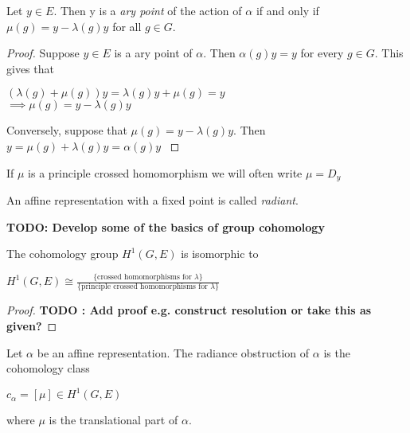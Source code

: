 \begin{prop}
    Let $y\in E$. Then y is a \textit{ary point} of the action of $\alpha$ if
    and only if $\mu(g) = y - \lambda(g)y$ for all $g \in G$.
    \label{prop:ary-point}
\end{prop}

\begin{proof}
    Suppose $y \in E$ is a ary point of $\alpha$. Then $\alpha(g)y = y$ for every $g \in G$.
    This gives that
    \begin{center}
        $(\lambda(g) + \mu(g))y = \lambda(g)y + \mu(g) = y$\\
        $ \implies \mu(g) = y - \lambda(g)y$
    \end{center}

    Conversely, suppose that $\mu(g) = y - \lambda(g)y$. Then $y = \mu(g) +
        \lambda(g)y = \alpha(g)y$ \label{lemma:ary}
\end{proof}
\begin{remark}
    If $\mu$ is a principle crossed homomorphism we will often write $\mu = D_y$
\end{remark}

\begin{remark}
    An affine representation with a fixed point is called \textit{radiant}.
\end{remark}

\textbf{TODO: Develop some of the basics of group cohomology}

\begin{lemma}
    The cohomology group $H^1(G, E)$ is isomorphic to
    \begin{center}
        $H^1(G,E) \cong \frac{\{\text{crossed homomorphisms for } \lambda\}}{\{\text{principle crossed homomorphisms for } \lambda\}}$
    \end{center}
    \label{lemma:crossed-coho}
\end{lemma}

\begin{proof}
    \textbf{TODO : Add proof e.g. construct resolution or take this as given?}
\end{proof}

\begin{definition}
    Let $\alpha$ be an affine representation. The radiance obstruction of $\alpha$ is the cohomology
    class
    \begin{center}
        $c_{\alpha} = [\mu] \in H^1(G, E)$
    \end{center}
    where $\mu$ is the translational part of $\alpha$.
\end{definition}


